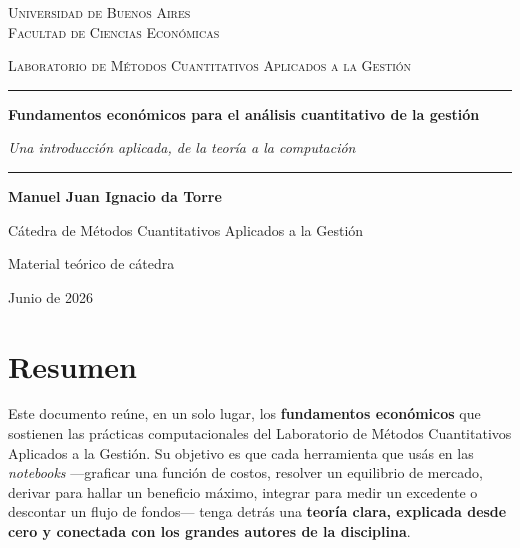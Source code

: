 \documentclass[11pt,a4paper,oneside]{report}
\theoremstyle{definition}
\begin{document}
\begin{titlepage}
\centering
\vspace*{1.2cm}
{\scshape\large Universidad de Buenos Aires\\ Facultad de Ciencias Económicas\par}
\vspace{0.4cm}
{\scshape Laboratorio de Métodos Cuantitativos Aplicados a la Gestión\par}
\vspace{1.8cm}
{\color{azulcat}\rule{\linewidth}{1.2pt}\par}
\vspace{0.8cm}
{\Huge\bfseries Fundamentos económicos para el análisis cuantitativo de la gestión\par}
\vspace{0.6cm}
{\large\itshape Una introducción aplicada, de la teoría a la computación\par}
\vspace{0.6cm}
{\color{azulcat}\rule{\linewidth}{1.2pt}\par}
\vspace{2.2cm}
{\large\bfseries Manuel \quad\textbullet\quad Juan Ignacio da Torre\par}
\vspace{0.3cm}
{\small\color{grissuave} Cátedra de Métodos Cuantitativos Aplicados a la Gestión\par}
\vfill
{\large Material teórico de cátedra\par}
\vspace{0.3cm}
{\large Junio de 2026\par}
\end{titlepage}

\thispagestyle{plain}
\chapter*{Resumen}

Este documento reúne, en un solo lugar, los \textbf{fundamentos económicos} que sostienen las prácticas computacionales del Laboratorio de Métodos Cuantitativos Aplicados a la Gestión. Su objetivo es que cada herramienta que usás en las \emph{notebooks} —graficar una función de costos, resolver un equilibrio de mercado, derivar para hallar un beneficio máximo, integrar para medir un excedente o descontar un flujo de fondos— tenga detrás una \textbf{teoría clara, explicada desde cero y conectada con los grandes autores de la disciplina}.
\end{document}
